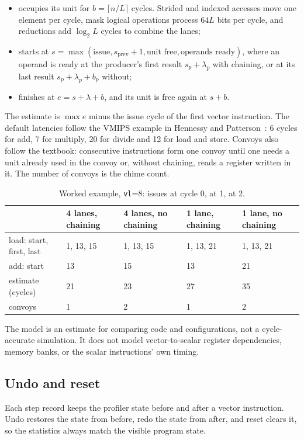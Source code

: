 \documentclass[11pt]{article}
\begin{document}
\begin{itemize}
\item occupies its unit for $b = \lceil n/L\rceil$ cycles. Strided and indexed accesses move one
      element per cycle, mask logical operations process $64L$ bits per cycle, and reductions add
      $\log_2 L$ cycles to combine the lanes;
\item starts at $s = \max(\text{issue}, s_\text{prev}+1, \text{unit free}, \text{operands ready})$,
      where an operand is ready at the producer's first result $s_p+\lambda_p$ with chaining, or
      at its last result $s_p+\lambda_p+b_p$ without;
\item finishes at $e = s + \lambda + b$, and its unit is free again at $s + b$.
\end{itemize}

The estimate is $\max e$ minus the issue cycle of the first vector instruction. The default
latencies follow the VMIPS example in Hennessy and Patterson~\cite{hp}: 6 cycles for add, 7 for
multiply, 20 for divide and 12 for load and store. Convoys also follow the textbook: consecutive
instructions form one convoy until one needs a unit already used in the convoy or, without
chaining, reads a register written in it. The number of convoys is the chime count.

\begin{table}[H]
\centering\small
\caption{Worked example, \texttt{vl}=8:  issues at cycle 0,  at 1,
 at 2.}\label{tab:timing}
\begin{tabularx}{\textwidth}{@{}L{3.4cm}YYYY@{}}
\toprule
 & 4 lanes, chaining & 4 lanes, no chaining & 1 lane, chaining & 1 lane, no chaining \\
\midrule
load: start, first, last & 1, 13, 15 & 1, 13, 15 & 1, 13, 21 & 1, 13, 21 \\
add: start & 13 & 15 & 13 & 21 \\
estimate (cycles) & 21 & 23 & 27 & 35 \\
convoys & 1 & 2 & 1 & 2 \\
\bottomrule
\end{tabularx}
\end{table}

The model is an estimate for comparing code and configurations, not a cycle-accurate
simulation. It does not model vector-to-scalar register dependencies, memory banks, or the
scalar instructions' own timing.

\subsection{Undo and reset}
Each step record keeps the profiler state before and after a vector instruction. Undo restores
the state from before, redo the state from after, and reset clears it, so the statistics always
match the visible program state.
\end{document}
